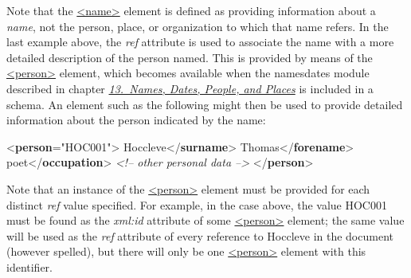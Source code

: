 Note that the \hyperref[TEI.name]{<name>} element is defined as providing information about a \textit{name}, not the person, place, or organization to which that name refers. In the last example above, the {\itshape ref} attribute is used to associate the name with a more detailed description of the person named. This is provided by means of the \hyperref[TEI.person]{<person>} element, which becomes available when the \textsf{namesdates} module described in chapter \textit{\hyperref[ND]{13.\ Names, Dates, People, and Places}} is included in a schema. An element such as the following might then be used to provide detailed information about the person indicated by the name: \par\bgroup{}\exampleFont \begin{shaded}\noindent\mbox{}{<\textbf{person}\hspace*{1em}{xml:id}="{HOC001}">}\mbox{}\newline 
{}\mbox{}\newline 
\hspace*{1em}Hoccleve{</\textbf{surname}>}\mbox{}\newline 
\hspace*{1em}Thomas{</\textbf{forename}>}\mbox{}\newline 
{}\mbox{}\newline 
{}\mbox{}\newline 
{}poet{</\textbf{occupation}>}\mbox{}\newline 
\textit{<!-- other personal data -->}\mbox{}\newline 
{</\textbf{person}>}\end{shaded}\egroup\par \noindent   Note that an instance of the \hyperref[TEI.person]{<person>} element must be provided for each distinct {\itshape ref} value specified. For example, in the case above, the value HOC001 must be found as the {\itshape xml:id} attribute of some \hyperref[TEI.person]{<person>} element; the same value will be used as the {\itshape ref} attribute of every reference to Hoccleve in the document (however spelled), but there will only be one \hyperref[TEI.person]{<person>} element with this identifier.\par
